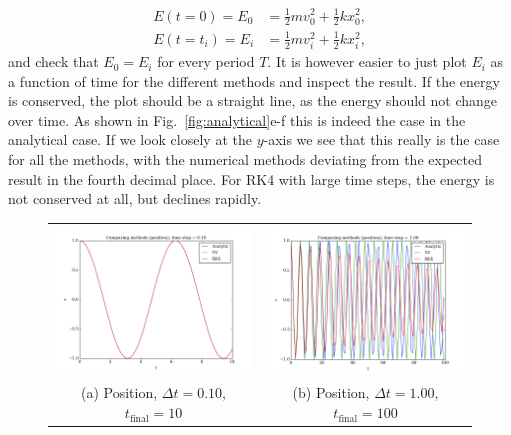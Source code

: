 \documentclass{article}
\begin{document}
\begin{multicols}{2}
\begin{equation}
	\begin{aligned}
		E(t = 0) = E_0 &= \frac{1}{2}mv_0^2 + \frac{1}{2}kx_0^2, \\
		E(t = t_i) = E_i &= \frac{1}{2}mv_i^2 + \frac{1}{2}kx_i^2,
	\end{aligned}
\end{equation}
and check that $E_0 = E_i$ for every period $T$. It is however easier to just plot $E_i$ as a function of time for the different methods and inspect the result. If the energy is conserved, the plot should be a straight line, as the energy should not change over time. As shown in Fig.~\ref{fig:analytical}e-f this is indeed the case in the analytical case. If we look closely at the $y$-axis we see that this really is the case for all the methods, with the numerical methods deviating from the expected result in the fourth decimal place. For RK4 with large time steps, the energy is not conserved at all, but declines rapidly.\\


\begin{figure}
\begin{center}
\begin{tabular}{cc}
  	\includegraphics[width=90mm]{Images/comparison_x_01.png}
	& \includegraphics[width=90mm]{Images/comparison_x_1.png} \\
	(a) Position, $\Delta t = 0.10$, $t_{\mathrm{final}} = 10$				& (b) Position, $\Delta t = 1.00$, $t_{\mathrm{final}} = 100$  \\[6pt]
	

\end{tabular}
\end{center}
\end{figure}
\end{multicols}
\end{document}
